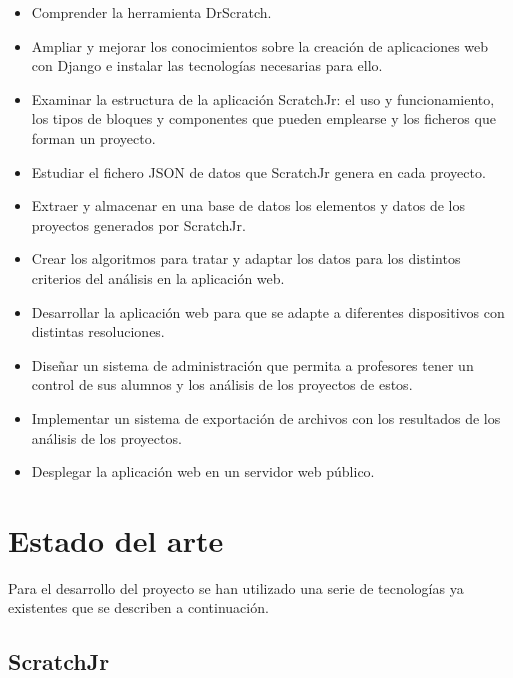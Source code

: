 \documentclass[a4paper, 12pt]{book}
\begin{document}
\begin{itemize}
    \item Comprender la herramienta DrScratch.
    \item Ampliar y mejorar los conocimientos sobre la creación de aplicaciones web con Django e instalar las tecnologías necesarias para ello.
    \item Examinar la estructura de la aplicación ScratchJr: el uso y funcionamiento, los tipos de bloques y componentes que pueden emplearse y los ficheros que forman un proyecto.
    \item Estudiar el fichero JSON de datos que ScratchJr genera en cada proyecto.
    \item Extraer y almacenar en una base de datos los elementos y datos de los proyectos generados por ScratchJr.
    \item Crear los algoritmos para tratar y adaptar los datos para los distintos criterios del análisis en la aplicación web.
    \item Desarrollar la aplicación web para que se adapte a diferentes dispositivos con distintas resoluciones.
    \item Diseñar un sistema de administración que permita a profesores tener un control de sus alumnos y los análisis de los proyectos de estos.
    \item Implementar un sistema de exportación de archivos con los resultados de los análisis de los proyectos.
    \item Desplegar la aplicación web en un servidor web público.
    
\end{itemize}



\cleardoublepage
\chapter{Estado del arte}
\label{chap:estado}

Para el desarrollo del proyecto se han utilizado una serie de tecnologías ya existentes que se describen a continuación.


\section{ScratchJr}
\label{sec:scratchJr}
\end{document}
